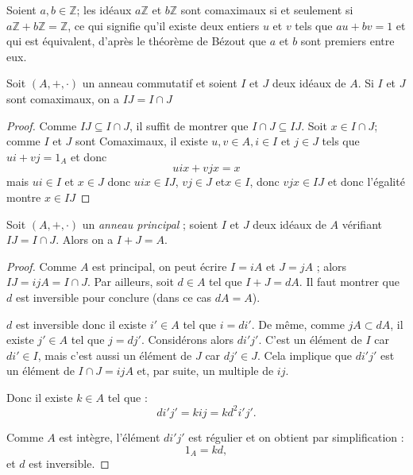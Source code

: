     \begin{exemple}
        Soient $a,b\in \mathbb{Z}$; les idéaux $a\mathbb{Z}$ et $b\mathbb{Z}$ sont comaximaux si et seulement si $a\mathbb{Z}+b\mathbb{Z}=\mathbb{Z}$, ce qui signifie qu'il existe deux entiers $u$ et $v$ tels que $au+bv=1$ et qui est équivalent, d'après le théorème de Bézout que $a$ et $b$ sont premiers entre eux. 
        \end{exemple}

    \begin{proposition}
        Soit $(A,+,\cdot)$ un anneau commutatif et soient $I$ et $J$ deux idéaux de $A$. Si $I$ et $J$ sont comaximaux, on a $IJ=I\cap J$
    \end{proposition}

\begin{proof}
    Comme $IJ \subseteq I\cap J$, il suffit de montrer que $I\cap J \subseteq IJ$. Soit $x\in I\cap J$; comme $I$ et $J$ sont Comaximaux, il existe $u,v\in A, i\in I$ et $j\in J$ tels que $ui+vj=1_A$ et donc 
    \[
    uix+vjx=x
    \]
    mais $ui\in I$ et $x\in J$ donc $uix\in IJ$, $vj \in J$ et$x\in I$, donc $vjx \in IJ$ et donc l'égalité montre $x\in IJ$
\end{proof}

    \begin{proposition}
        Soit $(A,+,\cdot)$ un \textit{anneau principal} ; soient $I$ et $J$ deux idéaux de $A$ vérifiant $IJ = I \cap J$. Alors on a $I + J = A$.
    \end{proposition}

\begin{proof}
    Comme $A$ est principal, on peut écrire $I = iA$ et $J = jA$ ; alors $IJ = ijA = I \cap J$. Par ailleurs, soit $d \in A$ tel que $I + J = dA$. Il faut montrer que $d$ est inversible pour conclure (dans ce cas $dA = A$).

$d$ est inversible donc il existe $i' \in A$ tel que $i = di'$. De même, comme $jA \subset dA$, il existe $j' \in A$ tel que $j = dj'$. Considérons alors $di'j'$. C'est un élément de $I$ car $di' \in I$, mais c'est aussi un élément de $J$ car $dj' \in J$. Cela implique que $di'j'$ est un élément de $I \cap J = ijA$ et, par suite, un multiple de $ij$. 

Donc il existe $k \in A$ tel que :
\[
di'j' = kij = kd^2 i'j'.
\]

Comme $A$ est intègre, l'élément $di'j'$ est régulier et on obtient par simplification :
\[
1_A = kd,
\]
et $d$ est inversible.
\end{proof}


